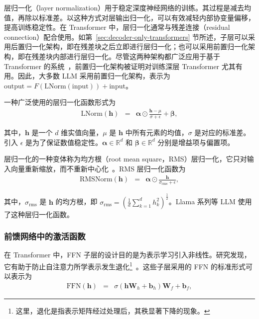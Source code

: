 \noindent 层归一化（layer normalization）用于稳定深度神经网络的训练。其过程是减去均值，再除以标准差。以这种方式对层输出归一化，可以有效减轻内部协变量偏移，提高训练稳定性。在 Transformer 中，层归一化通常与残差连接（residual connection）配合使用。如第~\ref{sec:decoder-only-transformers} 节所述，子层可以采用后置归一化架构，即在残差块之后立即进行层归一化；也可以采用前置归一化架构，即在残差块内部进行层归一化。尽管这两种架构都广泛应用于基于 Transformer 的系统~\cite{wang-etal:2019learning}，前置归一化架构被证明对训练深层 Transformer 尤其有用。因此，大多数 LLM 采用前置归一化架构，表示为 $\mathrm{output} = F(\mathrm{LNorm}(\mathrm{input})) + \mathrm{input}$。

一种广泛使用的层归一化函数形式为
\begin{eqnarray}
\mathrm{LNorm}(\mathbf{h}) & = & \boldsymbol{\alpha} \odot \frac{\mathbf{h} - \mu}{\sigma + \epsilon} + \boldsymbol{\beta},
\end{eqnarray}

\noindent 其中，$\mathbf{h}$ 是一个 $d$ 维实值向量，$\mu$ 是 $\mathbf{h}$ 中所有元素的均值，$\sigma$ 是对应的标准差。引入 $\epsilon$ 是为了保证数值稳定性。$\boldsymbol{\alpha} \in \mathbb{R}^{d}$ 和 $\boldsymbol{\beta} \in \mathbb{R}^{d}$ 分别是增益项与偏置项。

层归一化的一种变体称为均方根（root mean square，RMS）层归一化，它只对输入向量重新缩放，而不重新中心化~\cite{zhang-sennrich:2019root}。RMS 层归一化函数为
\begin{eqnarray}
\mathrm{RMSNorm}(\mathbf{h}) & = & \boldsymbol{\alpha} \odot \frac{\mathbf{h}}{\sigma_{\mathrm{rms}} + \epsilon},
\end{eqnarray}

\noindent 其中，$\sigma_{\mathrm{rms}}$ 是 $\mathbf{h}$ 的均方根，即 $\sigma_{\mathrm{rms}} = (\frac{1}{d} \sum_{k=1}^{d} h_k^2)^{\frac{1}{2}}$。Llama 系列等 LLM 使用了这种层归一化函数。

\subsubsection{前馈网络中的激活函数}

\noindent 在 Transformer 中，FFN 子层的设计目的是为表示学习引入非线性。研究发现，它有助于防止自注意力所学表示发生退化\footnote{这里，退化是指表示矩阵经过处理后，其秩显著下降的现象。}~\cite{dong-etal:2021attention}。这些子层采用的 FFN 的标准形式可以表示为
\begin{eqnarray}
\mathrm{FFN}(\mathbf{h}) & = & \sigma(\mathbf{h} \mathbf{W}_h + \mathbf{b}_h) \mathbf{W}_f + \mathbf{b}_f \label{eq:llm-ffn-basic},
\end{eqnarray}

